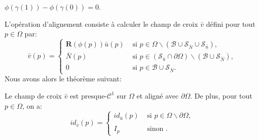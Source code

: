 \begin{lemma}
    $\phi(\gamma(1))-\phi(\gamma(0))=0$.
\end{lemma}


L'opération d'alignement consiste à calculer le champ de croix $\bar{v}$ défini pour tout $p\in\Omega$ par:
\begin{equation}
\bar{v}(p)=
\left\{
\begin{array}{ll}
\mathbf{R}(\phi(p))\bar{u}(p) & \mbox{ si } p\in\Omega\backslash(\mathcal{B}\cup\mathcal{S}_{\bar{N}}\cup\mathcal{S}_{\bar{u}}),\\[0.5cm]
\bar{N}(p) & \mbox{ si } p\in(\mathcal{S}_{\bar{u}}\cap\partial\Omega)\backslash(\mathcal{B}\cup\mathcal{S}_{\bar{N}}),\\[0.5cm]
0 & \mbox{ si } p\in\mathcal{B}\cup\mathcal{S}_{\bar{N}}.
\end{array}
\right.
\end{equation}
Nous avons alors le théorème suivant:
\begin{theorem}
Le champ de croix $\bar{v}$ est presque-$\mathcal{C}^1$ sur $\Omega$ et aligné avec $\partial\Omega$. De plus, pour tout $p\in\Omega$, on a:
\begin{equation}
id_{\bar{v}}(p)=
\left\{
\begin{array}{ll}
    id_{\bar{u}}(p) & \mbox{ si } p\in\Omega\backslash\partial\Omega,\\\\
    I_p & \mbox{ sinon }.
\end{array}
\right.
\end{equation}
\end{theorem}



